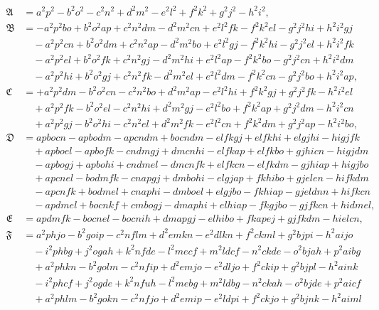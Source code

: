 \documentclass[11pt,a4paper]{article}
\theoremstyle{plain}
\theoremstyle{definition}
\theoremstyle{remark}
\begin{document}
\begin{align*}
\mathfrak{A} &= a^2p^2 - b^2o^2 - c^2n^2 + d^2m^2 - e^2l^2 + f^2k^2 + g^2j^2 - h^2i^2, \\
\mathfrak{B} &= -a^2p^2bo + b^2o^2ap + c^2n^2dm - d^2m^2cn + e^2l^2fk - f^2k^2el - g^2j^2hi + h^2i^2gj \\
&\quad -a^2p^2cn + b^2o^2dm + c^2n^2ap - d^2m^2bo + e^2l^2gj - f^2k^2hi - g^2j^2el + h^2i^2fk \\
&\quad -a^2p^2el + b^2o^2fk + c^2n^2gj - d^2m^2hi + e^2l^2ap - f^2k^2bo - g^2j^2cn + h^2i^2dm \\
&\quad -a^2p^2hi + b^2o^2gj + c^2n^2fk - d^2m^2el + e^2l^2dm - f^2k^2cn - g^2j^2bo + h^2i^2ap, \\
\mathfrak{C} &= +a^2p^2dm - b^2o^2cn - c^2n^2bo + d^2m^2ap - e^2l^2hi + f^2k^2gj + g^2j^2fk - h^2i^2el \\
&\quad +a^2p^2fk - b^2o^2el - c^2n^2hi + d^2m^2gj - e^2l^2bo + f^2k^2ap + g^2j^2dm - h^2i^2cn \\
&\quad +a^2p^2gj - b^2o^2hi - c^2n^2el + d^2m^2fk - e^2l^2cn + f^2k^2dm + g^2j^2ap - h^2i^2bo, \\
\mathfrak{D} &= apbocn - apbodm - apcndm + bocndm - elfkgj + elfkhi + elgjhi - higjfk \\
&\quad + apboel - apbofk - cndmgj + dmcnhi - elfkap + elfkbo + gjhicn - higjdm \\
&\quad - apbogj + apbohi + cndmel - dmcnfk + elfkcn - elfkdm - gjhiap + higjbo \\
&\quad + apcnel - bodmfk - cnapgj + dmbohi - elgjap + fkhibo + gjelen - hifkdm \\
&\quad - apcnfk + bodmel + cnaphi - dmboel + elgjbo - fkhiap - gjeldnn + hifkcn \\
&\quad - apdmel + bocnkf + cmbogj - dmaphi + elhiap - fkgjbo - gjfkcn + hidmel, \\
\mathfrak{E} &= apdmfk - bocnel - bocnih + dmapgj - elhibo + fkapej + gjfkdm - hielcn, \\
\mathfrak{F} &= a^2phjo - b^2goip - c^2nflm + d^2emkn - e^2dlkn + f^2ckml + g^2bjpi - h^2aijo \\
&\quad -i^2phbg + j^2ogah + k^2nfde - l^2mecf + m^2ldcf - n^2ckde - o^2bjah + p^2aibg \\
&\quad +a^2phkn - b^2golm - c^2nfip + d^2emjo - e^2dljo + f^2ckip + g^2bjpl - h^2aink \\
&\quad -i^2phcf + j^2ogde + k^2nfuh - l^2mebg + m^2ldbg - n^2ckah - o^2bjde + p^2aicf \\
&\quad +a^2phlm - b^2gokn - c^2nfjo + d^2emip - e^2ldpi + f^2ckjo + g^2bjnk - h^2aiml \\

\end{align*}
\end{document}
